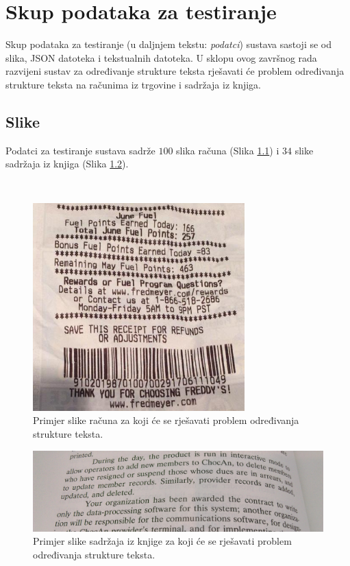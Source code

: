 \documentclass[times, utf8, zavrsni]{fer}
\begin{document}
\chapter{Skup podataka za testiranje}
\label{chap:skup-padataka-za-testiranje}

Skup podataka za testiranje (u daljnjem tekstu: \emph{podatci})
sustava sastoji se od slika, JSON datoteka i tekstualnih datoteka.
U sklopu ovog završnog rada razvijeni sustav za određivanje strukture teksta
rješavati će problem određivanja strukture teksta na računima iz trgovine i
sadržaja iz knjiga.

\section{Slike}
\label{sec:slike}

Podatci za testiranje sustava sadrže $100$ slika računa
(Slika \ref{fig:receipt-example-04}) i $34$ slike sadržaja iz knjiga (Slika \ref{fig:book-example-03}).

\

\begin{figure}[htb]
    \centering
    \captionsetup{justification=centering,margin=2cm}
    \includegraphics[height=8cm]{images/receipt-example-04.jpg}
    \caption{Primjer slike računa za koji će se rješavati problem određivanja strukture teksta.}
    \label{fig:receipt-example-04}
\end{figure}

\pagebreak

\begin{figure}[htb]
    \centering
    \captionsetup{justification=centering,margin=2cm}
    \includegraphics[width=\textwidth]{images/book-example-03.jpg}
    \caption{Primjer slike sadržaja iz knjige za koji će se rješavati problem određivanja strukture teksta.}
    \label{fig:book-example-03}
\end{figure}
\end{document}
